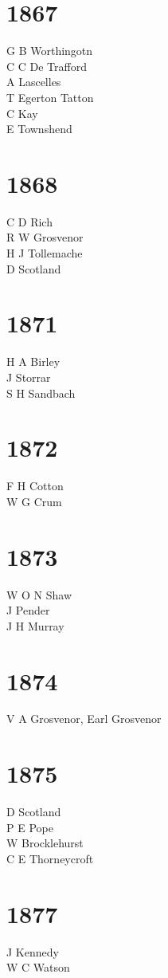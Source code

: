 \begin{multicols}{2}
  \section*{1867}
  G B Worthingotn \\
  C C De Trafford \\
  A Lascelles \\
  T Egerton Tatton \\
  C Kay \\
  E Townshend \\
  \section*{1868}
  C D Rich \\
  R W Grosvenor \\
  H J Tollemache \\
  D Scotland \\
  \section*{1871}
  H A Birley \\
  J Storrar \\
  S H Sandbach \\
  \section*{1872}
  F H Cotton \\
  W G Crum \\
  \section*{1873}
  W O N Shaw \\
  J Pender \\
  J H Murray \\
  \section*{1874}
  V A Grosvenor, Earl Grosvenor \\
  \section*{1875}
  D Scotland \\
  P E Pope \\
  W Brocklehurst \\
  C E Thorneycroft \\
  \section*{1877}
  J Kennedy \\
  W C Watson \\

\end{multicols}
